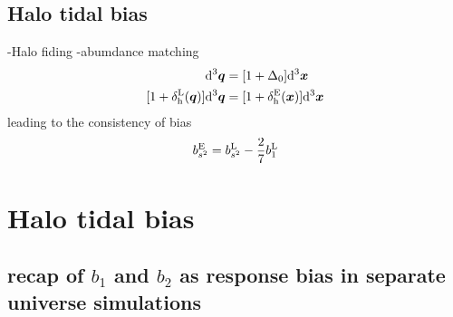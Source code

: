 \documentclass[a4paper,11pt]{article}
\renewcommand{\d}{\mathrm{d}}
\newcommand{\vx}{{\bm x}}
\newcommand{\vq}{{\bm q}}
\begin{document}
\subsection{Halo tidal bias}
-Halo fiding
-abumdance matching
\begin{align}
\d^3\vq &= [1+\Delta_0]\d^3\vx 
\\
[1+\delta^{\rm L}_{\rm h}(\vq)]\d^3\vq &= [1+\delta^{\rm E}_{\rm h}(\vx)]\d^3\vx
\end{align}
leading to the consistency of bias
\begin{align}
b^{\rm E}_{s^2} = b^{\rm L}_{s^2} -\frac{2}{7}b_1^{\rm L}
\end{align}



\section{Halo tidal bias}
\label{sec:bias}
\subsection{recap of $b_1$ and $b_2$ as response bias in separate universe simulations}
\end{document}
